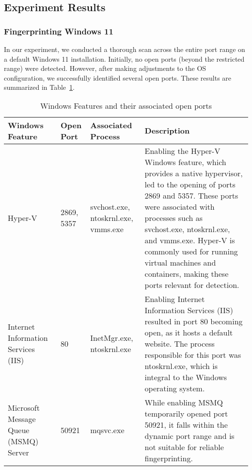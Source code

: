 \clearpage

\subsection{Experiment Results}

\subsubsection{Fingerprinting Windows 11}
\label{section:win11-fingerprint}

In our experiment, we conducted a thorough scan across the entire port range on a default Windows 11 installation. Initially, no open ports (beyond the restricted range) were detected. However, after making adjustments to the OS configuration, we successfully identified several open ports. These results are summarized in Table~\ref{tab:windows-features-open-ports}.

\begin{table}[htbp]
\begin{adjustwidth}{-0.5cm}{}
\footnotesize
\centering
\begin{tabular}{p{4cm}p{1cm}p{2cm}p{8cm}}
    \toprule
    Windows Feature & Open Port & Associated Process & Description \\
     \midrule
     Hyper-V & 2869, 5357 & svchost.exe, ntoskrnl.exe, vmms.exe & Enabling the Hyper-V Windows feature, which provides a native hypervisor, led to the opening of ports 2869 and 5357. These ports were associated with processes such as svchost.exe, ntoskrnl.exe, and vmms.exe. Hyper-V is commonly used for running virtual machines and containers, making these ports relevant for detection. \\
     
     Internet Information Services (IIS) & 80 & InetMgr.exe, ntoskrnl.exe & Enabling Internet Information Services (IIS) resulted in port 80 becoming open, as it hosts a default website. The process responsible for this port was ntoskrnl.exe, which is integral to the Windows operating system. \\
     
     Microsoft Message Queue (MSMQ) Server & 50921 & mqsvc.exe & While enabling MSMQ temporarily opened port 50921, it falls within the dynamic port range and is not suitable for reliable fingerprinting. \\
     \bottomrule
\end{tabular}
\caption{Windows Features and their associated open ports}
\label{tab:windows-features-open-ports}
\end{adjustwidth}{}
\end{table}

